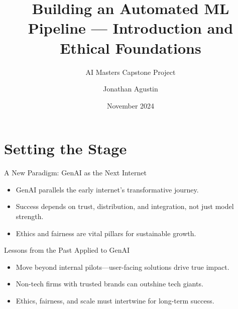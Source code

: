 \documentclass[aspectratio=169]{beamer}
\title{Building an Automated ML Pipeline — Introduction and Ethical Foundations}
\subtitle{AI Masters Capstone Project}
\author{Jonathan Agustin}
\date{November 2024}
\begin{document}
\maketitle

\section{Setting the Stage}

\begin{frame}{A New Paradigm: GenAI as the Next Internet}
\begin{itemize}
\item GenAI parallels the early internet’s transformative journey.
\item Success depends on trust, distribution, and integration, not just model strength.
\item Ethics and fairness are vital pillars for sustainable growth.
\end{itemize}
\end{frame}

\begin{frame}{Lessons from the Past Applied to GenAI}
\begin{itemize}
\item Move beyond internal pilots—user-facing solutions drive true impact.
\item Non-tech firms with trusted brands can outshine tech giants.
\item Ethics, fairness, and scale must intertwine for long-term success.
\end{itemize}
\end{frame}
\end{document}
